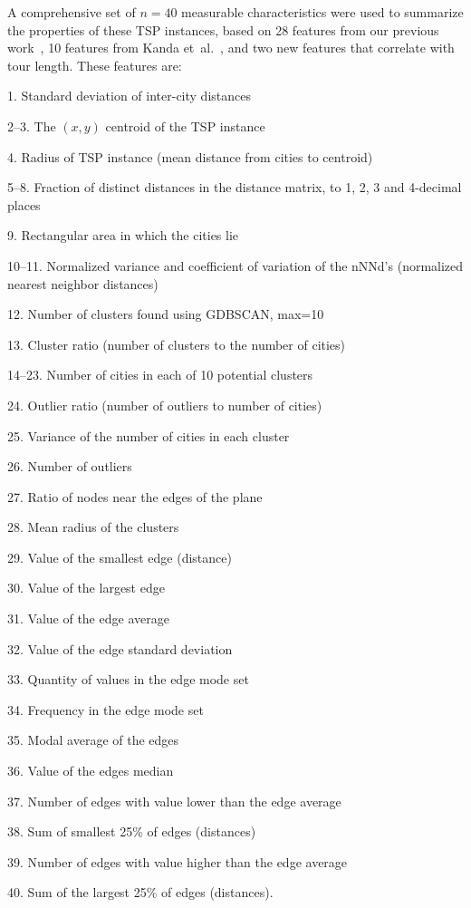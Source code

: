 \documentclass[conference]{IEEEtran}
\begin{document}
A comprehensive set of $n = 40$ measurable characteristics were used to summarize the properties of these TSP instances, based on 28 features from our previous work~\cite{AMAI}, 10 features from Kanda et~al.~\cite{Kanda}, and two new features that correlate with tour length. These features are:
\begin{trivlist}
\item 1. Standard deviation of inter-city distances
\item 2--3. The $(x, y)$ centroid of the TSP instance
\item 4. Radius of TSP instance (mean distance from cities to centroid)
\item 5--8. Fraction of distinct distances in the distance matrix, to 1, 2, 3 and 4-decimal places
\item 9. Rectangular area in which the cities lie
\item 10--11. Normalized variance and coefficient of variation of the nNNd's (normalized nearest neighbor distances)
\item 12. Number of clusters found using GDBSCAN, max=10
\item 13. Cluster ratio (number of clusters to the number of cities)
\item 14--23. Number of cities in each of 10 potential clusters
\item 24. Outlier ratio (number of outliers to number of cities)
\item 25. Variance of the number of cities in each cluster
\item 26. Number of outliers
\item 27. Ratio of nodes near the edges of the plane
\item 28. Mean radius of the clusters
\item 29. Value of the smallest edge (distance)
\item 30. Value of the largest edge
\item 31. Value of the edge average
\item 32. Value of the edge standard deviation
\item 33. Quantity of values in the edge mode set
\item 34. Frequency in the edge mode set
\item 35. Modal average of the edges
\item 36. Value of the edges median
\item 37. Number of edges with value lower than the edge average
\item 38. Sum of smallest 25\% of edges (distances)
\item 39. Number of edges with value higher than the edge average
\item 40. Sum of the largest 25\% of edges (distances).
\end{trivlist}
\end{document}
